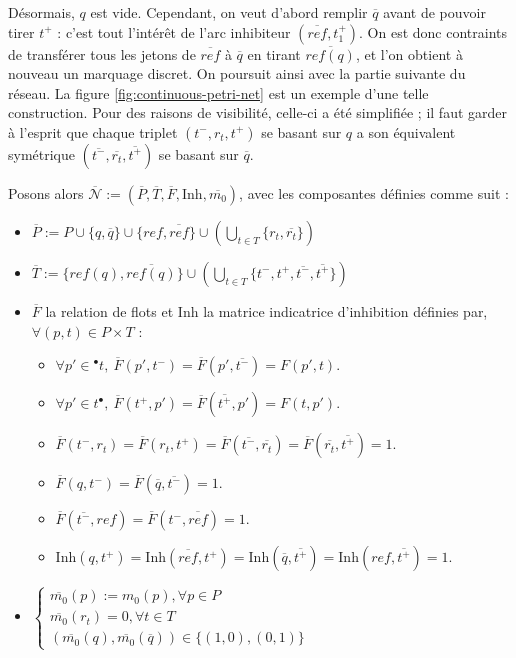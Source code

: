 \documentclass{article}
\theoremstyle{remark}
\theoremstyle{remark}
\newcommand{\preb}[1]{{}^\bullet #1}
\newcommand{\postb}[1]{#1^\bullet}
\newcommand{\inhibitor}{\mathrm{Inh}}
\begin{document}
Désormais, $q$ est vide. Cependant, on veut d'abord remplir $\overline{q}$ avant de pouvoir tirer $t^+$ : c'est tout l'intérêt de l'arc inhibiteur $(\overline{ref}, t_1^+)$. On est donc contraints de transférer tous les jetons de $\overline{ref}$ à $\overline{q}$ en tirant $\overline{ref(q)}$, et l'on obtient à nouveau un marquage discret. On poursuit ainsi avec la partie suivante du réseau. La figure \ref{fig:continuous-petri-net} est un exemple d'une telle construction. Pour des raisons de visibilité, celle-ci a été simplifiée ; il faut garder à l'esprit que chaque triplet $(t^-, r_t, t^+)$ se basant sur $q$ a son équivalent symétrique $(\overline{t^-}, \overline{r_t}, \overline{t^+})$ se basant sur $\overline{q}$.

Posons alors $\overline{\mathcal{N}} := (\overline{P}, \overline{T}, \overline{F}, \inhibitor, \overline{m_0})$, avec les composantes définies comme suit :
\begin{itemize}
    \item $\overline{P} := P \cup \{q, \overline{q}\} \cup \{ref, \overline{ref}\} \cup (\bigcup \limits_{t \in T} \{r_t, \overline{r_t}\})$
    \item $\overline{T} := \{ref(q), \overline{ref(q)}\} \cup (\bigcup \limits_{{t\in T}} \{t^-, t^+, \overline{t^-}, \overline{t^+}\})$
    \item $\overline{F}$ la relation de flots et $\inhibitor$ la matrice indicatrice d'inhibition définies par, $\forall (p, t) \in P \times T$ : \begin{itemize}
        \item $\forall p' \in \preb{t},\ \overline{F}(p', t^-) = \overline{F}(p', \overline{t^-}) = F(p', t)$.
        \item $\forall p' \in \postb{t},\ \overline{F}(t^+, p') = \overline{F}(\overline{t^+}, p') = F(t, p')$.
        \item $\overline{F}(t^-, r_t) = \overline{F}(r_t, t^+) = \overline{F}(\overline{t^-}, \overline{r_t}) = \overline{F}(\overline{r_t}, \overline{t^+}) = 1$.
        \item $\overline{F}(q, t^-) = \overline{F}(\overline{q}, \overline{t^-}) = 1$.
        \item $\overline{F}(\overline{t^-}, ref) = \overline{F}(t^-, \overline{ref}) = 1$.
        \item $\inhibitor(q, t^+) = \inhibitor(\overline{ref}, t^+) = \inhibitor(\overline{q}, \overline{t^+}) = \inhibitor(ref, \overline{t^+}) = 1$.
    \end{itemize}
    \item $\begin{cases}
        \overline{m_0}(p) := m_0(p), \forall p \in P \\
        \overline{m_0}(r_t) = 0, \forall t \in T \\
        (\overline{m_0}(q), \overline{m_0}(\overline{q})) \in \{(1, 0), (0, 1)\}
    \end{cases}$
\end{itemize}
\end{document}
